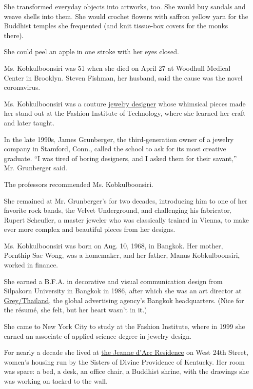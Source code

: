 She transformed everyday objects into artworks, too. She would buy
sandals and weave shells into them. She would crochet flowers with
saffron yellow yarn for the Buddhist temples she frequented (and knit
tissue-box covers for the monks there).

She could peel an apple in one stroke with her eyes closed.

Ms. Kobkulboonsiri was 51 when she died on April 27 at Woodhull Medical
Center in Brooklyn. Steven Fishman, her husband, said the cause was the
novel coronavirus.

Ms. Kobkulboonsiri was a couture
\href{http://www.yupadeedesign.com}{jewelry designer} whose whimsical
pieces made her stand out at the Fashion Institute of Technology, where
she learned her craft and later taught.

In the late 1990s, James Grunberger, the third-generation owner of a
jewelry company in Stamford, Conn., called the school to ask for its
most creative graduate. ``I was tired of boring designers, and I asked
them for their savant,'' Mr. Grunberger said.

The professors recommended Ms. Kobkulboonsiri.

She remained at Mr. Grunberger's for two decades, introducing him to one
of her favorite rock bands, the Velvet Underground, and challenging his
fabricator, Rupert Scheufler, a master jeweler who was classically
trained in Vienna, to make ever more complex and beautiful pieces from
her designs.

Ms. Kobkulboonsiri was born on Aug. 10, 1968, in Bangkok. Her mother,
Pornthip Sae Wong, was a homemaker, and her father, Manus
Kobkulboonsiri, worked in finance.

She earned a B.F.A. in decorative and visual communication design from
Silpakorn University in Bangkok in 1986, after which she was an art
director at \href{https://www.grey.com/en/thailand}{Grey/Thailand}, the
global advertising agency's Bangkok headquarters. (Nice for the résumé,
she felt, but her heart wasn't in it.)

She came to New York City to study at the Fashion Institute, where in
1999 she earned an associate of applied science degree in jewelry
design.

For nearly a decade she lived at
\href{https://jdaresidence.com/the-residence}{the Jeanne d'Arc
Residence} on West 24th Street, women's housing run by the Sisters of
Divine Providence of Kentucky. Her room was spare: a bed, a desk, an
office chair, a Buddhist shrine, with the drawings she was working on
tacked to the wall.

